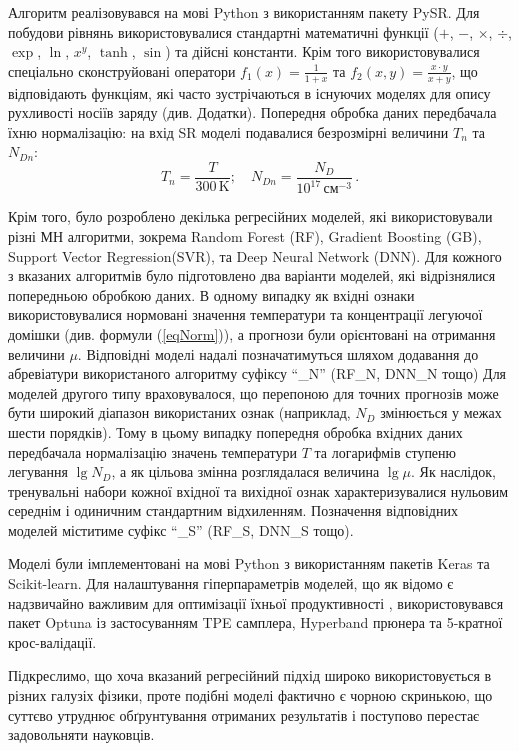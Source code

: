 \documentclass[fleqn,twoside,twocolumn,nofootinbib,showkeys]{revtex4} %
\begin{document}
Алгоритм реалізовувався на мові Python з використанням пакету PySR\cite{cranmer2023}.
Для побудови рівнянь використовувалися стандартні математичні функції
($+$, $-$, $\times$, $\div$, $\exp$, $\ln$, $x^y$, $\tanh$, $\sin$) та дійсні константи.
Крім того використовувалися спеціально сконструйовані оператори
$f_1(x)=\frac{1}{1+x}$ та $f_2(x,y)=\frac{x\cdot y}{x+y}$,
що відповідають функціям, які часто зустрічаються в існуючих моделях для опису рухливості носіїв заряду (див. Додатки).
Попередня обробка даних передбачала їхню нормалізацію:
на вхід SR моделі подавалися безрозмірні величини $T_n$ та $N_{Dn}$:
\begin{equation}\label{eqNorm}
  T_n = \frac{T}{300\,\text{K}};\quad N_{Dn} = \frac{N_D}{10^{17}\,\text{см}^{-3}}\,.
\end{equation}

Крім того, було розроблено декілька регресійних моделей, які використовували різні МН алгоритми, зокрема
Random Forest (RF),
Gradient Boosting (GB),
Support Vector Regression(SVR),
та Deep Neural Network (DNN).
Для кожного з вказаних алгоритмів було підготовлено два варіанти моделей,
які відрізнялися попередньою обробкою даних.
В одному випадку як вхідні ознаки використовувалися нормовані значення температури та концентрації легуючої домішки
(див. формули (\ref{eqNorm})), а прогнози були орієнтовані на отримання величини $\mu$.
Відповідні моделі надалі позначатимуться шляхом додавання до абревіатури використаного алгоритму суфіксу ``\_N'' (RF\_N, DNN\_N тощо)
Для моделей другого типу враховувалося, що перепоною для точних прогнозів може бути широкий діапазон використаних ознак
(наприклад, $N_D$ змінюється у межах шести порядків).
Тому в цьому випадку  попередня обробка вхідних даних передбачала нормалізацію
значень температури $T$ та логарифмів ступеню легування $\lg N_D$,
а як цільова змінна розглядалася величина $\lg \mu$.
Як наслідок, тренувальні набори кожної вхідної та вихідної ознак
характеризувалися нульовим середнім і одиничним стандартним відхиленням.
Позначення відповідних моделей міститиме суфікс ``\_S'' (RF\_S, DNN\_S тощо).

Моделі були імплементовані на мові Python з використанням пакетів Keras та Scikit-learn.
Для налаштування гіперпараметрів  моделей, що як відомо є надзвичайно важливим для оптимізації їхньої продуктивності \cite{Hanif2024},
використовувався пакет Optuna \cite{Akiba2019} із застосуванням TPE самплера, Hyperband прюнера та 5-кратної крос-валідації.

Підкреслимо, що хоча вказаний регресійний підхід широко використовується в різних галузіх фізики, проте
подібні моделі фактично є чорною скринькою, що суттєво утруднює обґрунтування отриманих результатів
і поступово перестає задовольняти науковців.
\end{document}
